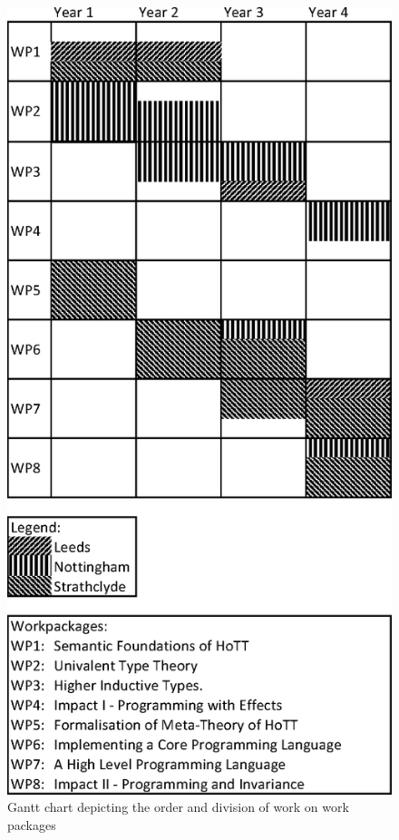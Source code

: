 \documentclass[a4paper,11pt]{article}
\begin{document}
\newpage
\begin{figure}
\centering
\includegraphics{Gantt.eps}
\caption{Gantt chart depicting the order and division of work on work packages}
\end{figure}
\newpage
\end{document}
